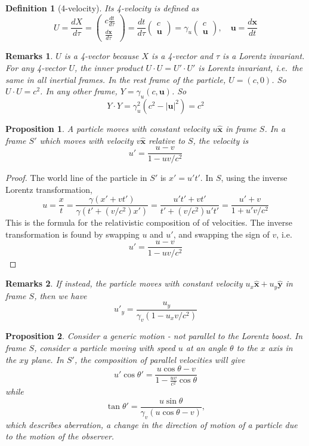\documentclass[a4paper]{article}
\newtheorem{remarks}{Remarks}[section]
\theoremstyle{new}
\newtheorem{defi}{Definition}[section]
\newtheorem{prop}{Proposition}[section]
\begin{document}
\begin{defi}[4-velocity]
Its 4-velocity is defined as
$$U = \frac{d X}{d \tau} =
    \begin{pmatrix}
      c\frac{d t}{d \tau}\\
      \frac{d \mathbf{x}}{d \tau}
    \end{pmatrix}
    = \frac{d t}{d \tau}
    \begin{pmatrix}
      c\\
      \mathbf{u}
    \end{pmatrix} = \gamma_u
    \begin{pmatrix}
      c\\
      \mathbf{u}
    \end{pmatrix},\quad\mathbf{u} = \frac{d \mathbf{x}}{d t}$$
\end{defi}
\begin{remarks}
$U$ is a 4-vector because $X$ is a 4-vector and $\tau$ is a Lorentz invariant. For any 4-vector $U$, the inner product $U\cdot U = U' \cdot U'$ is Lorentz invariant, i.e.\ the same in all inertial frames. In the rest frame of the particle, $U = (c, 0)$. So $U\cdot U = c^2$. In any other frame, $Y = \gamma_u(c, \mathbf{u})$. So
$$ Y\cdot Y = \gamma_u^2 (c^2 - |\mathbf{u}|^2) = c^2$$
\end{remarks}
\begin{prop}
A particle moves with constant velocity $u\mathbf{\hat{x}}$ in frame $S$. In a frame $S'$ which moves with velocity $v\mathbf{\hat{x}}$ relative to $S$, the velocity is
$$u'=\frac{u-v}{1-uv/c^2}$$
\end{prop}
\begin{proof}
The world line of the particle in $S'$ is $x'=u't'$. In $S$, using the inverse Lorentz transformation,
$$u = \frac{x}{t} = \frac{\gamma(x' + vt')}{\gamma(t' + (v/c^2) x')} = \frac{u't' + vt'}{t' + (v/c^2)u't'} = \frac{u' + v}{1 + u'v/c^2}$$
This is the formula for the relativistic composition of of velocities. The inverse transformation is found by swapping $u$ and $u'$, and swapping the sign of $v$, i.e.
$$ u' = \frac{u - v}{1 - uv/c^2}$$
\end{proof}
\begin{remarks}
If instead, the particle moves with constant velocity $u_x\mathbf{\hat{x}}+u_y\mathbf{\hat{y}}$ in frame $S$, then we have
$$u'_y=\frac{u_y}{\gamma_v(1-u_xv/c^2)}$$
\end{remarks}
\begin{prop}
Consider a generic motion - not parallel to the Lorentz boost. In frame $S$, consider a particle moving with speed $u$ at an angle $\theta$ to the $x$ axis in the $xy$ plane. In $S'$, the composition of parallel velocities will give
$$u'\cos \theta' = \frac{u\cos \theta - v}{1 - \frac{uv}{c^2}\cos \theta}$$
while
\[
  \tan \theta' = \frac{u\sin \theta}{\gamma_v(u\cos \theta - v)},
\]
which describes aberration, a change in the direction of motion of a particle due to the motion of the observer. 
\end{prop}
\end{document}
